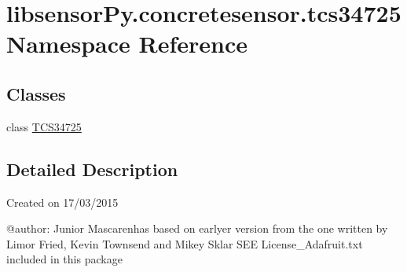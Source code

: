 \hypertarget{namespacelibsensorPy_1_1concretesensor_1_1tcs34725}{}\section{libsensor\+Py.\+concretesensor.\+tcs34725 Namespace Reference}
\label{namespacelibsensorPy_1_1concretesensor_1_1tcs34725}
\subsection*{Classes}
\begin{DoxyCompactItemize}
\item 
class \hyperlink{classlibsensorPy_1_1concretesensor_1_1tcs34725_1_1TCS34725}{T\+C\+S34725}
\end{DoxyCompactItemize}


\subsection{Detailed Description}
\begin{DoxyVerb}Created on 17/03/2015

@author: Junior Mascarenhas
based on earlyer version from
the one written by Limor Fried, Kevin Townsend and Mikey Sklar
SEE License_Adafruit.txt included in this package
\end{DoxyVerb}
 
